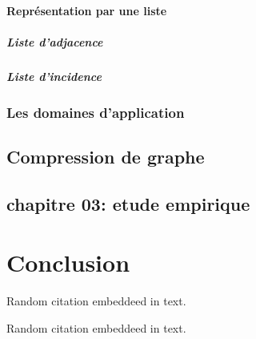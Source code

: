 \documentclass[11pt,a4paper]{report}
\begin{document}
		\subsection{Représentation par une liste}
			\subsubsection{Liste d'adjacence}
			\subsubsection{Liste d'incidence}
			
			
	\section{Les domaines d'application}
	

	\chapter{Compression de graphe}
	


	\chapter{chapitre 03: etude empirique}

\part{Conclusion} 


Random citation \citep{seo2018effective} embeddeed in text.

Random citation \citep{brisaboa2009k} embeddeed in text.

\newpage


\end{document}
